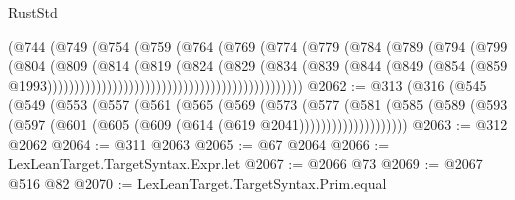\begin{lexlean}{RustStd}
\begin{coremodule}
                                                  (@744
                                                    (@749
                                                      (@754
                                                        (@759
                                                          (@764
                                                            (@769
                                                              (@774
                                                                (@779
                                                                  (@784
                                                                    (@789
                                                                      (@794
                                                                        (@799
                                                                          (@804
                                                                            (@809
                                                                              (@814
                                                                                (@819
                                                                                  (@824
                                                                                    (@829
                                                                                      (@834
                                                                                        (@839
                                                                                          (@844
                                                                                            (@849
                                                                                              (@854
                                                                                                (@859
                                                                                                  @1993)))))))))))))))))))))))))))))))))))))))))))))))
@2062 := @313
    (@316
      (@545
        (@549
          (@553
            (@557
              (@561
                (@565
                  (@569
                    (@573
                      (@577
                        (@581
                          (@585
                            (@589
                              (@593 (@597 (@601 (@605 (@609 (@614 (@619 @2041))))))))))))))))))))
@2063 := @312 @2062
@2064 := @311 @2063
@2065 := @67 @2064
@2066 := LexLeanTarget.TargetSyntax.Expr.let
@2067 := @2066 @73
@2069 := @2067 @516 @82
@2070 := LexLeanTarget.TargetSyntax.Prim.equal

\end{coremodule}
\end{lexlean}
